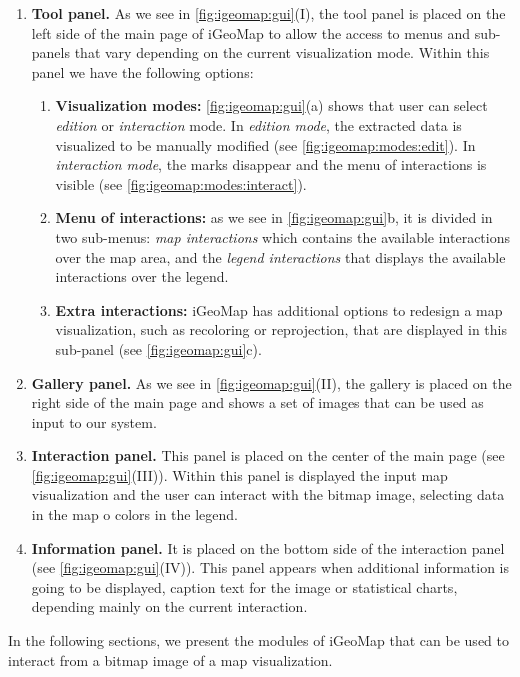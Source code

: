 \figIGMgui

\begin{enumerate}[label=\Roman*)]
 \item\textbf{Tool panel.}    As we see in \autoref{fig:igeomap:gui}(I), the tool panel is placed on the left side of the main page of iGeoMap to allow the access to menus and sub-panels that vary depending on the current visualization mode. Within this panel we have the following options:
 \begin{enumerate}[label=\alph*)]
  \item\textbf{Visualization modes:} \autoref{fig:igeomap:gui}(a) shows that user can select \textit{edition} or \textit{interaction} mode. In \textit{edition mode}, the extracted data is visualized to be manually modified (see \autoref{fig:igeomap:modes:edit}). In \textit{interaction mode}, the marks disappear and the menu of interactions is visible (see \autoref{fig:igeomap:modes:interact}).
  \item\textbf{Menu of interactions:} as we see in \autoref{fig:igeomap:gui}b, it is divided in two sub-menus: \textit{map interactions} which contains the available interactions over the map area, and the \textit{legend interactions} that displays the available interactions over the legend.
  \item\textbf{Extra interactions:} iGeoMap has additional options to redesign a map visualization, such as recoloring or reprojection, that are displayed in this sub-panel (see \autoref{fig:igeomap:gui}c).
 \end{enumerate}
    
 \item\textbf{Gallery panel.} As we see in \autoref{fig:igeomap:gui}(II), the gallery is placed on the right side of the main page and shows a set of images that can be used as input to our system.
 
 \item\textbf{Interaction panel.} This panel is placed on the center of the main page (see \autoref{fig:igeomap:gui}(III)). Within this panel is displayed the input map visualization and the user can interact with the bitmap image, selecting data in the map o colors in the legend.
 
 \item\textbf{Information panel.} It is placed on the bottom side of the interaction panel (see \autoref{fig:igeomap:gui}(IV)). This panel appears when additional information is going to be displayed, \eg caption text for the image or statistical charts, depending mainly on the current interaction.
\end{enumerate}

In the following sections, we present the modules of iGeoMap that can be used to interact from a bitmap image of a map visualization.
